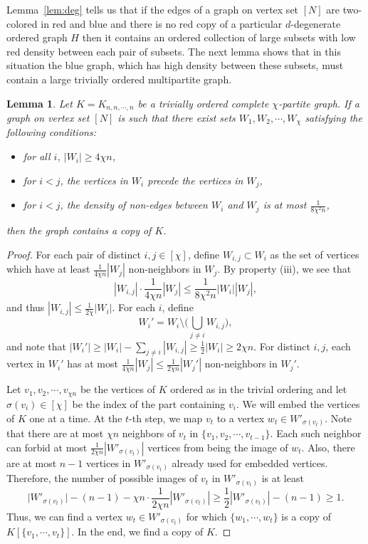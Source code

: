 \documentclass[11pt]{article}
\newtheorem{lemma}[theorem]{Lemma}
\begin{document}
Lemma~\ref{lem:deg} tells us that if the edges of a graph on vertex set $[N]$ are two-colored in red and blue and there is no red copy of a particular $d$-degenerate ordered graph $H$ then it contains an ordered collection of large subsets with low red density between each pair of subsets. The next lemma shows that in this situation the blue graph, which has high density between these subsets, must contain a large trivially ordered multipartite graph.

\begin{lemma} \label{lem:chipart}
\label{lem:degenerate2}Let $K=K_{n,n,\cdots,n}$ be a trivially ordered
complete $\chi$-partite graph. If a graph on vertex set $[N]$ is such that 
there exist sets $W_{1},W_{2},\cdots,W_{\chi}$ satisfying the following conditions:
\begin{itemize}
\item[(i)] 
for all $i$, $|W_{i}|\ge4\chi n$,

\item[(ii)] 
for $i< j$, the vertices in $W_{i}$ precede the vertices in $W_{j}$,

\item[(iii)] 
for $i<j$, the density of non-edges between $W_{i}$ and $W_{j}$ is at most $\frac{1}{8\chi^2 n}$,
\end{itemize}
then the graph contains a copy of $K$.
\end{lemma}

\begin{proof}
For each pair of distinct $i,j\in[\chi]$, define $W_{i,j}\subset W_{i}$
as the set of vertices which have at least $\frac{1}{4 \chi n}|W_{j}|$
non-neighbors in $W_{j}$. By property (iii), we see that 
\[|W_{i,j}|\cdot\frac{1}{4 \chi n}|W_{j}|\le\frac{1}{8\chi^2 n}|W_{i}||W_{j}|,\]
and thus $|W_{i,j}|\le\frac{1}{2\chi}|W_{i}|$. For
each $i$, define 
\[
W_{i}'=W_{i}\setminus\big(\bigcup_{j\neq i}W_{i,j}\big),
\]
and note that $|W_{i}'|\ge|W_{i}|-\sum_{j\neq i}|W_{i,j}|\ge\frac{1}{2}|W_{i}|\ge2 \chi n$.
For distinct $i,j$, each vertex in $W_{i}'$ has at most $\frac{1}{4\chi n}|W_{j}|\le\frac{1}{2\chi n}|W_{j}'|$
non-neighbors in $W_{j}'$.

Let $v_{1},v_{2},\cdots, v_{\chi n}$ be the vertices of $K$ ordered as in
the trivial ordering
and let $\sigma(v_{i})\in[\chi]$ be the index of the part containing $v_{i}$. We will embed the vertices of $K$ one at a time. At the $t$-th
step, we map $v_{t}$ to a vertex $w_{t} \in W'_{\sigma(v_{t})}$.
Note that there are at most $\chi n$ neighbors of $v_{t}$ in $\{v_{1},v_{2},\cdots,v_{t-1}\}$.
Each such neighbor can forbid at most $\frac{1}{2 \chi n}|W'_{\sigma(v_{t})}|$
vertices from being the image of $w_{t}$. Also, there are at most $n-1$ vertices in $W'_{\sigma(v_{t})}$ already used for embedded vertices. Therefore, the number of
possible images of $v_{t}$ in $W'_{\sigma(v_{t})}$ is at least
\[
\big|W'_{\sigma(v_{t})}\big|-(n-1)-\chi n\cdot\frac{1}{2\chi n}|W'_{\sigma(v_{t})}|\ge\frac{1}{2}|W'_{\sigma(v_{t})}|-(n-1)\ge1.
\]
Thus, we can find a vertex $w_{t}\in W'_{\sigma(v_{t})}$ for which
$\{w_{1},\cdots,w_{t}\}$ is a copy of $K[\{v_{1},\cdots,v_{t}\}]$.
In the end, we find a copy of $K$. 
\end{proof}
\end{document}
